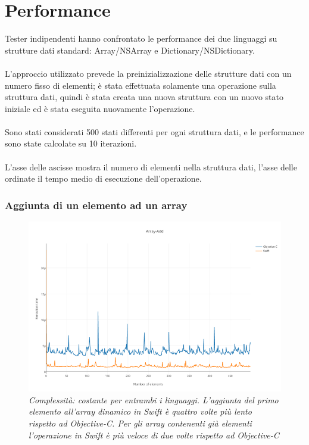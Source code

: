 \section{Performance}
Tester indipendenti hanno confrontato le performance dei due linguaggi su strutture dati standard: Array/NSArray e Dictionary/NSDictionary.\\\\
L'approccio utilizzato prevede la preinizializzazione delle strutture dati con un numero fisso di elementi; è stata effettuata solamente una operazione sulla struttura dati, quindi è stata creata una nuova struttura con un nuovo stato iniziale ed è stata eseguita nuovamente l'operazione.\\\\ Sono stati considerati 500 stati differenti per ogni struttura dati, e le performance sono state calcolate su 10 iterazioni.\\\\L'asse delle ascisse mostra il numero di elementi nella struttura dati, l'asse delle ordinate il tempo medio di esecuzione dell'operazione.
\subsubsection{Aggiunta di un elemento ad un array}
\begin{figure}[H]
      \centering
      \includegraphics[scale=0.50]{immagini/array_add.png}
            \vspace{0.8cm}
            \caption{\textit{Complessità: costante per entrambi i linguaggi. L'aggiunta del primo elemento all'array dinamico in Swift è quattro volte più lento rispetto ad Objective-C.
Per gli array contenenti già elementi l'operazione in Swift è più veloce di due volte rispetto ad Objective-C}}
\end{figure}

